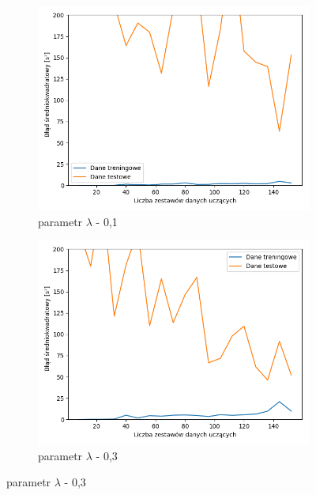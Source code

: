 \documentclass[12pt]{aghdpl}
\begin{document}
		\begin{figure}[h]
			\begin{subfigure}{.5\linewidth}
		 		\includegraphics[width =\linewidth]{wykresy/6_regularyzacja/l1/regularyzacja_0_1_learning_curves.png}
		 		\caption{parametr $\lambda$ - 0,1}
		 	\end{subfigure}
		 	\begin{subfigure}{.5\linewidth}
		 		\includegraphics[width =\linewidth]{wykresy/6_regularyzacja/l1/regularyzacja_0_3_learning_curves.png}
		 		\caption{parametr $\lambda$ - 0,3}
		 	\end{subfigure}
		 	

\end{figure}
\end{document}
